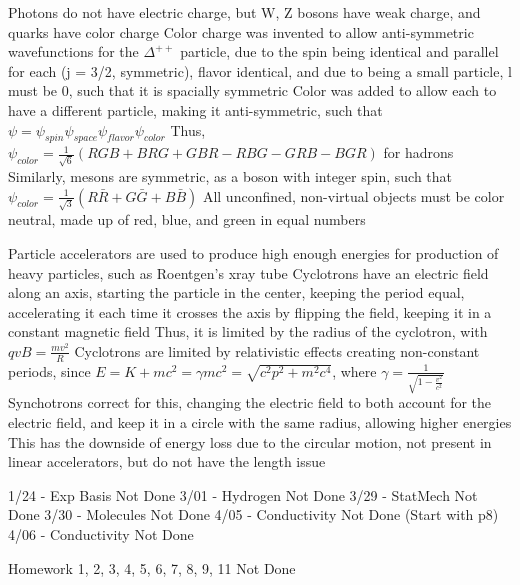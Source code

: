 \documentclass[11 pt, twoside]{article}
\newenvironment{outline*}
{
	\begin{outline}[enumerate]
	}
	{\end{outline}
}
\begin{document}
\begin{outline*}
\1 Photons do not have electric charge, but W, Z bosons have weak charge, and quarks have color charge
\1 Color charge was invented to allow anti-symmetric wavefunctions for the $\Delta^{++}$ particle, due to the spin being identical and parallel for each (j = 3/2, symmetric), flavor identical, and due to being a small particle, l must be 0, such that it is spacially symmetric
	\2 Color was added to allow each to have a different particle, making it anti-symmetric, such that $\psi = \psi_{spin}\psi_{space}\psi_{flavor}\psi_{color}$
		\3 Thus, $\psi_{color} = \frac{1}{\sqrt{6}}(RGB + BRG + GBR - RBG - GRB - BGR)$ for hadrons
		\3 Similarly, mesons are symmetric, as a boson with integer spin, such that $\psi_{color} = \frac{1}{\sqrt{3}}(R\bar{R} + G\bar{G} + B\bar{B})$
	\2 All unconfined, non-virtual objects must be color neutral, made up of red, blue, and green in equal numbers

\1 Particle accelerators are used to produce high enough energies for production of heavy particles, such as Roentgen's xray tube
	\2 Cyclotrons have an electric field along an axis, starting the particle in the center, keeping the period equal, accelerating it each time it crosses the axis by flipping the field, keeping it in a constant magnetic field
		\3 Thus, it is limited by the radius of the cyclotron, with $qvB = \frac{mv^2}{R}$
	\2 Cyclotrons are limited by relativistic effects creating non-constant periods, since $E = K + mc^2 = \gamma mc^2 = \sqrt{c^2p^2 + m^2c^4}$, where $\gamma = \frac{1}{\sqrt{1 - \frac{v^2}{c^2}}}$
		\3 Synchotrons correct for this, changing the electric field to both account for the electric field, and keep it in a circle with the same radius, allowing higher energies
		\3 This has the downside of energy loss due to the circular motion, not present in linear accelerators, but do not have the length issue

1/24 - Exp Basis Not Done
3/01 - Hydrogen Not Done
3/29 - StatMech Not Done
3/30 - Molecules Not Done
4/05 - Conductivity Not Done (Start with p8)
4/06 - Conductivity Not Done

Homework 1, 2, 3, 4, 5, 6, 7, 8, 9, 11 Not Done

\end{outline*}
\end{document}
